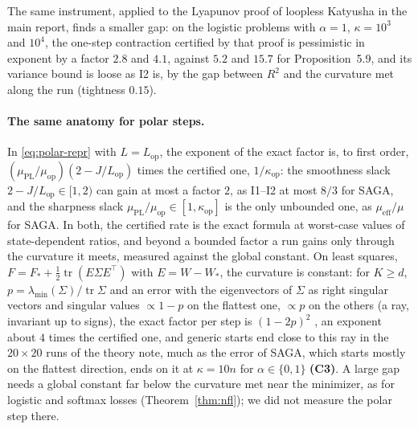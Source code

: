 \documentclass[10pt]{article}
\theoremstyle{remark}
\newcommand{\tr}{\operatorname{tr}}
\newcommand{\Lop}{L_{\mathrm{op}}}
\newcommand{\muop}{\mu_{\mathrm{op}}}
\newcommand{\kop}{\kappa_{\mathrm{op}}}
\newcommand{\lmin}{\lambda_{\min}}
\newcommand{\muEff}{\mu_{\mathrm{eff}}}
\newcommand{\muPL}{\mu_{\mathrm{PL}}}
\newcommand{\finding}[1]{\textbf{(#1)}}
\begin{document}
The same instrument, applied to the Lyapunov proof of loopless Katyusha \cite{kovalev2020dont} in the main report,
finds a smaller gap: on the logistic problems with $\alpha=1$, $\kappa=10^3$ and $10^4$, the one-step contraction
certified by that proof is pessimistic in exponent by a factor $2.8$ and $4.1$, against $5.2$ and $15.7$ for
Proposition~5.9, and its variance bound is loose as I2 is, by the gap between $R^2$ and the curvature met along the run
(tightness $0.15$).

\paragraph{The same anatomy for polar steps.} In \eqref{eq:polar-repr} with $L=\Lop$, the exponent of the exact factor
is, to first order, $(\muPL/\muop)(2-J/\Lop)$ times the certified one, $1/\kop$: the smoothness slack
$2-J/\Lop\in[1,2)$ can gain at most a factor $2$, as I1--I2 at most $8/3$ for SAGA, and the sharpness slack
$\muPL/\muop\in[1,\kop]$ is the only unbounded one, as $\muEff/\mu$ for SAGA. In both, the certified rate is the exact
formula at worst-case values of state-dependent ratios, and beyond a bounded factor a run gains only through the
curvature it meets, measured against the global constant. On least squares, $F=F_\ast+\frac12\tr(E\Sigma E^\top)$ with
$E=W-W_\ast$, the curvature is constant: for $K\ge d$, $p=\lmin(\Sigma)/\tr\Sigma$ and an error with the eigenvectors of $\Sigma$ as
right singular vectors and singular values $\propto1-p$ on the flattest one, $\propto p$ on the others (a ray, invariant up to signs),
the exact factor per step is $(1-2p)^2$ \cite{shulgin2026quadratic}, an exponent about $4$ times the certified one,
and generic starts end close to this ray in the $20\times20$ runs of the theory note, much as the error of SAGA, which
starts mostly on the flattest direction, ends on it at $\kappa=10n$ for $\alpha\in\{0,1\}$ \finding{C3}. A large gap needs a global constant
far below the curvature met near the minimizer, as for logistic and softmax losses (Theorem~\ref{thm:nfl}); we did not
measure the polar step there.
\end{document}
